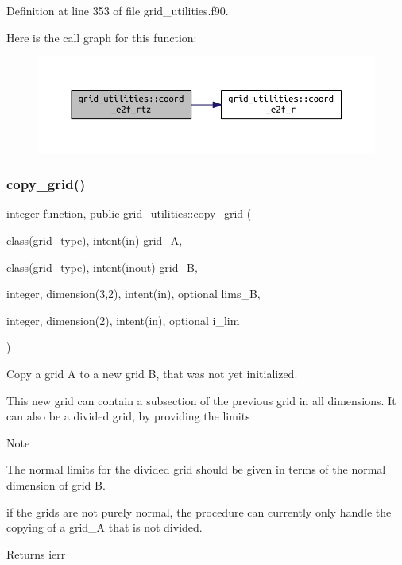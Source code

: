 Definition at line 353 of file grid\+\_\+utilities.\+f90.

Here is the call graph for this function\+:\nopagebreak
\begin{figure}[H]
\begin{center}
\leavevmode
\includegraphics[width=350pt]{namespacegrid__utilities_a2a3c0509679b438d9d5aa5bedfb7a7b8_cgraph}
\end{center}
\end{figure}
\mbox{\label{namespacegrid__utilities_a04f971c38083f873a04eb6568bed466b}} 
\subsubsection{\texorpdfstring{copy\+\_\+grid()}{copy\_grid()}}
{\footnotesize\ttfamily integer function, public grid\+\_\+utilities\+::copy\+\_\+grid (\begin{DoxyParamCaption}\item[{class(\hyperlink{structgrid__vars_1_1grid__type}{grid\+\_\+type}), intent(in)}]{grid\+\_\+A,  }\item[{class(\hyperlink{structgrid__vars_1_1grid__type}{grid\+\_\+type}), intent(inout)}]{grid\+\_\+B,  }\item[{integer, dimension(3,2), intent(in), optional}]{lims\+\_\+B,  }\item[{integer, dimension(2), intent(in), optional}]{i\+\_\+lim }\end{DoxyParamCaption})}



Copy a grid A to a new grid B, that was not yet initialized. 

This new grid can contain a subsection of the previous grid in all dimensions. It can also be a divided grid, by providing the limits

\begin{DoxyNote}{Note}

\begin{DoxyEnumerate}
\item The normal limits for the divided grid should be given in terms of the normal dimension of {\ttfamily grid} B.
\item if the grids are not purely normal, the procedure can currently only handle the copying of a {\ttfamily grid\+\_\+A} that is not divided.
\end{DoxyEnumerate}
\end{DoxyNote}
\begin{DoxyReturn}{Returns}
ierr
\end{DoxyReturn}

